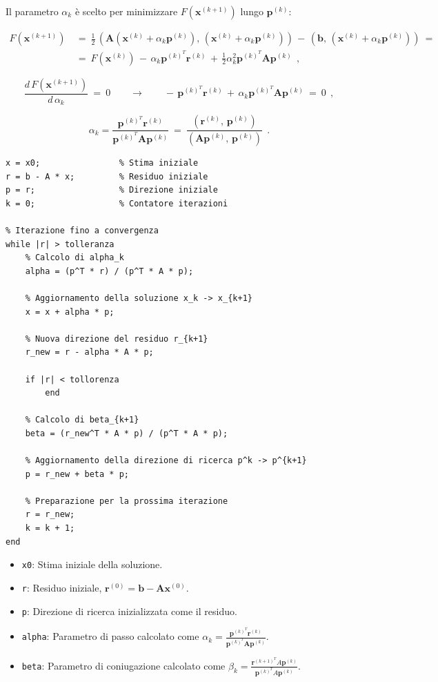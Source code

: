 Il parametro \(\alpha_k\) è scelto per minimizzare \(F(\mathbf{x}^{(k+1)})\) lungo \(\mathbf{p}^{(k)}\):

\[\begin{aligned}
F(\mathbf{x}^{(k+1)})\ &=\ 
\frac{1}{2}\, (\mathbf A (\mathbf x^{(k)}+\alpha_k \mathbf p^{(k)}),\, (\mathbf x^{(k)}+\alpha_k \mathbf p^{(k)}))\, -\, (\mathbf b, \, (\mathbf x^{(k)}+\alpha_k \mathbf p^{(k)}))\ =\\
&=\ F(\mathbf x^{(k)})\, -\, \alpha_k \mathbf p^{(k)^T} \mathbf r^{(k)}\, +\, \frac{1}{2}\alpha_k^2 \mathbf{p}^{(k)^T} \mathbf A \mathbf p^{(k)}\ \ ,
\end{aligned}\]

\[
\frac{d\, F(\mathbf x^{(k+1)})}{d\, \alpha_k}\ =\ 0
\qquad \rightarrow \qquad
-\, \mathbf p^{(k)^T} \mathbf{r}^{(k)}\, +\, \alpha_k \mathbf{p}^{(k)^T} \mathbf A \mathbf p^{(k)}\ =\ 0\ \ ,
\]

\begin{equation*}
	\alpha_k = \frac{\mathbf{p}^{(k)^T} \mathbf{r}^{(k)}}{\mathbf{p}^{(k)^T} \mathbf{A} \mathbf{p}^{(k)}}\ =\ 
	\frac{(\mathbf{r}^{(k)},\, \mathbf{p}^{(k)})}{(\mathbf{A} \mathbf{p}^{(k)},\, \mathbf{p}^{(k)})}\ \ .
\end{equation*}


\begin{lstlisting}[caption={Implementazione del CGM}]
% Inizializzazione
x = x0;                % Stima iniziale
r = b - A * x;         % Residuo iniziale
p = r;                 % Direzione iniziale
k = 0;                 % Contatore iterazioni
		
% Iterazione fino a convergenza
while |r| > tolleranza
	% Calcolo di alpha_k
	alpha = (p^T * r) / (p^T * A * p);
			
	% Aggiornamento della soluzione x_k -> x_{k+1}
	x = x + alpha * p;
			
	% Nuova direzione del residuo r_{k+1}
	r_new = r - alpha * A * p;
			
	if |r| < tollorenza
		end
			
	% Calcolo di beta_{k+1}
	beta = (r_new^T * A * p) / (p^T * A * p);
			
	% Aggiornamento della direzione di ricerca p^k -> p^{k+1}
	p = r_new + beta * p;
			
	% Preparazione per la prossima iterazione
	r = r_new;
	k = k + 1;
end
\end{lstlisting}


\begin{itemize}
	\item \texttt{x0}: Stima iniziale della soluzione.
	\item \texttt{r}: Residuo iniziale, $\mathbf{r}^{(0)} = \mathbf{b} - \mathbf{A} \mathbf{x}^{(0)}$.
	\item \texttt{p}: Direzione di ricerca inizializzata come il residuo.
	\item \texttt{alpha}: Parametro di passo calcolato come $\alpha_k = \frac{\mathbf{p}^{(k)^T} \mathbf{r}^{(k)}}{\mathbf{p}^{(k)^T} \mathbf{A} \mathbf{p}^{(k)}}$.
	\item \texttt{beta}: Parametro di coniugazione calcolato come $\beta_k = \frac{\mathbf{r}^{(k+1)^T} A\mathbf{p}^{(k)} }{ \mathbf{p}^{(k)^T} A\mathbf{p}^{(k)}}$.
\end{itemize}

